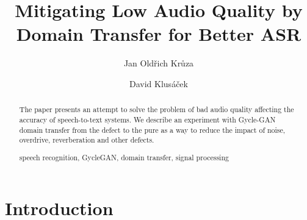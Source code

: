 \documentclass[runningheads,a4paper]{llncs}
\newcommand{\keywords}[1]{\par\addvspace\baselineskip
\noindent\keywordname\enspace\ignorespaces#1}
\begin{document}
\mainmatter  %

\title{Mitigating Low Audio Quality by Domain Transfer for Better ASR}


%
%
\author{Jan Oldřich Krůza \and David Klusáček}
%


%
%

\maketitle


\begin{abstract}
The paper presents an attempt to solve the problem of bad audio quality
affecting the accuracy of speech-to-text systems. We
describe an experiment with Gycle-GAN domain transfer from the defect to the
pure as a way to reduce the impact of noise, overdrive, reverberation and other
defects.
\keywords{speech recognition, GycleGAN, domain transfer, signal processing}
\end{abstract}

\section{Introduction}
\end{document}
